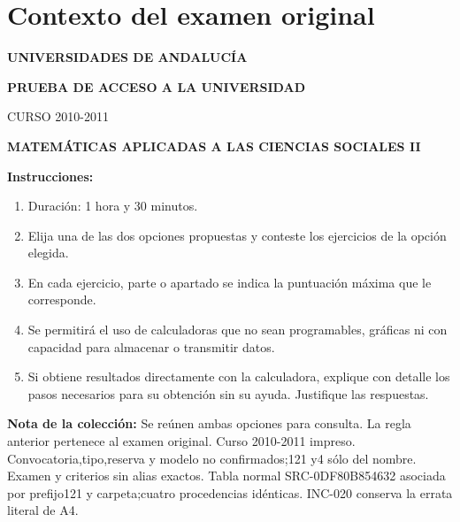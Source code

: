 \section*{Contexto del examen original}
\textbf{UNIVERSIDADES DE ANDALUCÍA}\par
\textbf{PRUEBA DE ACCESO A LA UNIVERSIDAD}\par
CURSO 2010-2011\par
\textbf{MATEMÁTICAS APLICADAS A LAS CIENCIAS SOCIALES II}

\textbf{Instrucciones:}
\begin{enumerate}[label=\textbf{\alph*)}]
  \item Duración: 1 hora y 30 minutos.
  \item Elija una de las dos opciones propuestas y conteste los ejercicios de la opción elegida.
  \item En cada ejercicio, parte o apartado se indica la puntuación máxima que le corresponde.
  \item Se permitirá el uso de calculadoras que no sean programables, gráficas ni con capacidad para almacenar o transmitir datos.
  \item Si obtiene resultados directamente con la calculadora, explique con detalle los pasos necesarios para su obtención sin su ayuda. Justifique las respuestas.
\end{enumerate}
\noindent\textbf{Nota de la colección:} Se reúnen ambas opciones para consulta. La regla anterior pertenece al examen original. Curso 2010-2011 impreso. Convocatoria,tipo,reserva y modelo no confirmados;121 y4 sólo del nombre. Examen y criterios sin alias exactos. Tabla normal SRC-0DF80B854632 asociada por prefijo121 y carpeta;cuatro procedencias idénticas. INC-020 conserva la errata literal de A4.
\par\medskip
